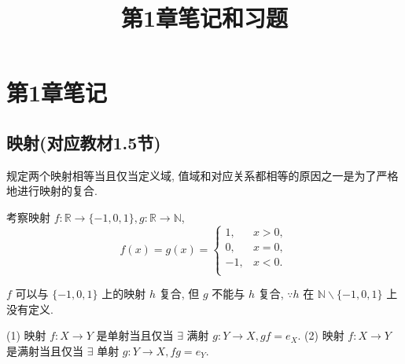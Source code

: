 \documentclass{ctexart}
\title{第1章笔记和习题}
\begin{document}
\maketitle
\section{第1章笔记}
\subsection{映射(对应教材1.5节)}
规定两个映射相等当且仅当定义域, 值域和对应关系都相等的原因之一是为了严格地进行映射的复合.
\begin{example}
    考察映射 $f:\mathbb{R}\to\{-1,0,1\},g:\mathbb{R}\to\mathbb{N}$,
    \[f(x)=g(x)=\begin{cases}
        1, & x>0, \\
        0, & x=0, \\
        -1, & x<0. \\
    \end{cases}\]

    $f$ 可以与 $\{-1,0,1\}$ 上的映射 $h$ 复合, 但 $g$ 不能与 $h$ 复合, $\because h$ 在 $\mathbb{N}\backslash\{-1,0,1\}$ 上没有定义.
\end{example}
\begin{theorem}
    (1) 映射 $f:X\to Y$ 是单射当且仅当 $\exists$ 满射 $g:Y\to X,gf=e_X$. (2) 映射 $f:X\to Y$ 是满射当且仅当 $\exists$ 单射 $g:Y\to X,fg=e_Y$.
\end{theorem}
\end{document}
